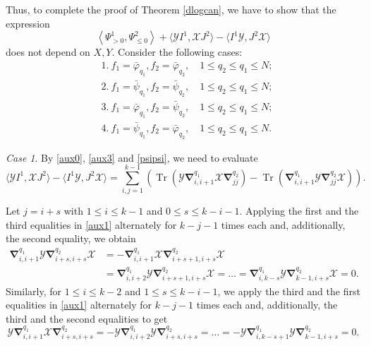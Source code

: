 \documentclass{amsart}
\theoremstyle{definition}
\theoremstyle{remark}
\numberwithin{equation}{section}
\numberwithin{theorem}{section}
\begin{document}
Thus, to complete the proof of Theorem \ref{dlogcan}, we have to show that the expression
\begin{equation}\label{bad}
 \left \langle \Psi^1_{>0}, \Psi^2_{\leq 0} \right \rangle+ 
 \langle {{\mathcal Y}} I^1,{{\mathcal X}} J^2\rangle  -  \langle I^1{{\mathcal Y}}, J^2{{\mathcal X}}\rangle
\end{equation}
does not depend on $X, Y$. 
Consider the following  cases:
\begin{equation}\label{4cases}
\begin{aligned}
&1.\ f_1=\bar{{\varphi}}_{q_1}, f_2=\bar{{\varphi}}_{q_2},\quad 1\leq q_2 \leq q_1 \leq N;\\
&2.\ f_1=\bar{{\psi}}_{q_1}, f_2=\bar{{\psi}}_{q_2},\quad 1\leq q_2 \leq q_1 \leq N;\\
&3.\ f_1=\bar{{\varphi}}_{q_1}, f_2=\bar{{\psi}}_{q_2},\quad 1\leq q_2 \leq q_1 \leq N;\\
&4.\ f_1=\bar{{\psi}}_{q_1}, f_2=\bar{{\varphi}}_{q_2},\quad 1\leq q_2 \leq q_1 \leq N.
\end{aligned}
\end{equation}

{\em Case 1}. By \eqref{aux0}, \eqref{aux3} and \eqref{psipsi}, we need to evaluate
$$
 \langle {{\mathcal Y}} I^1,{{\mathcal X}} J^2\rangle  -  \langle I^1{{\mathcal Y}}, J^2{{\mathcal X}}\rangle=\sum_{i,j=1}^{k-1}\left 
({\operatorname{Tr}}( {{\mathcal Y}}{\boldsymbol\nabla}_{i,i+1}^{q_1} {{\mathcal X}} {\boldsymbol\nabla}_{jj}^{q_2}) - {\operatorname{Tr}}(
{\boldsymbol\nabla}_{i,i+1}^{q_1} {{\mathcal Y}} {\boldsymbol\nabla}_{jj}^{q_2} {{\mathcal X}})\right ).
$$

Let $j=i+s$ with $1\leq i\leq k-1$ and  $0\leq s \leq k-i-1$. Applying the first and the third equalities in \eqref{aux1} 
alternately for $k-j-1$ times each and, additionally, the second equality, we obtain
\begin{equation}\label{indu1}
\begin{aligned}
 {\boldsymbol\nabla}_{i,i+1}^{q_1} {{\mathcal Y}} {\boldsymbol\nabla}_{i+s,i+s}^{q_2} {{\mathcal X}}&=-{\boldsymbol\nabla}_{i,i+1}^{q_1} {{\mathcal X}} {\boldsymbol\nabla}_{i+s+1,i+s}^{q_2} 
 {{\mathcal X}}\\
 &={\boldsymbol\nabla}_{i,i+2}^{q_1} {{\mathcal Y}} {\boldsymbol\nabla}_{i+s+1,i+s}^{q_2} {{\mathcal X}}=\ldots=
{\boldsymbol\nabla}_{i,k-s}^{q_1} {{\mathcal Y}} {\boldsymbol\nabla}_{k-1,i+s}^{q_2} {{\mathcal X}}=0.
\end{aligned}
\end{equation}
Similarly, for $1\leq i\leq k-2$ and $1\leq s\leq k-i-1$, we apply the third and the first equalities in \eqref{aux1} alternately
for $k-j-1$ times each and, additionally, the third and the second equalities  to get
\begin{equation*}
{{\mathcal Y}}{\boldsymbol\nabla}_{i,i+1}^{q_1} {{\mathcal X}} {\boldsymbol\nabla}_{i+s,i+s}^{q_2} =-{{\mathcal Y}}{\boldsymbol\nabla}_{i,i+2}^{q_1} {{\mathcal Y}} {\boldsymbol\nabla}_{i+s,i+s}^{q_2}
=\ldots=-{{\mathcal Y}}{\boldsymbol\nabla}_{i,k-s+1}^{q_1} {{\mathcal Y}} {\boldsymbol\nabla}_{k-1,i+s}^{q_2}=0. 
\end{equation*}
\end{document}
